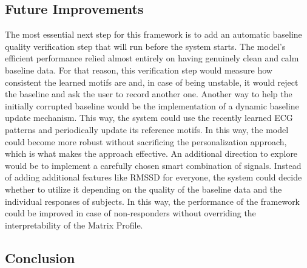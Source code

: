 \documentclass[conference,10pt]{IEEEtran}
\begin{document}
\subsection{Future Improvements}

The most essential next step for this framework is to add an automatic baseline quality verification step that will run before the system starts. The model’s efficient performance relied almost entirely on having genuinely clean and calm baseline data. For that reason, this verification step would measure how consistent the learned motifs are and, in case of being unstable, it would reject the baseline and ask the user to record another one. 
Another way to help the initially corrupted baseline would be the implementation of a dynamic baseline update mechanism. This way, the system could use the recently learned ECG patterns and periodically update its reference motifs. In this way, the model could become more robust without sacrificing the personalization approach, which is what makes the approach effective.
An additional direction to explore would be to implement a carefully chosen smart combination of signals. Instead of adding additional features like RMSSD for everyone, the system could decide whether to utilize it depending on the quality of the baseline data and the individual responses of subjects. In this way, the performance of the framework could be improved in case of non-responders without overriding the interpretability of the Matrix Profile.

\subsection{Conclusion}
\end{document}
